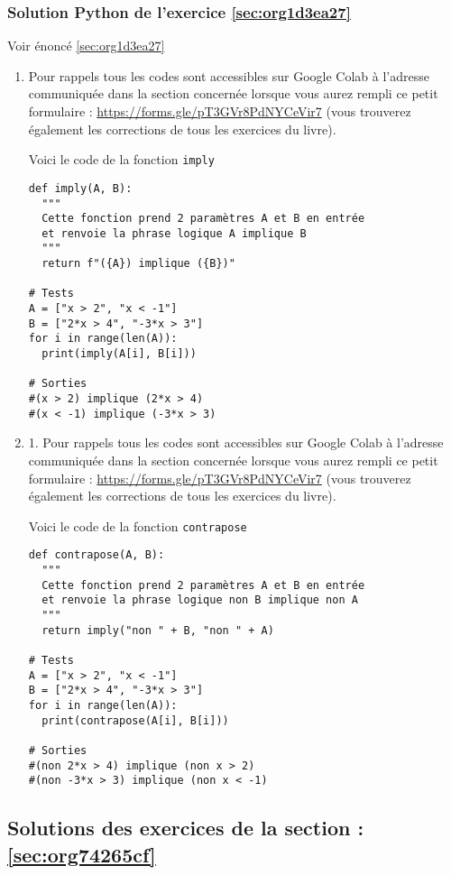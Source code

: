 \documentclass[a4paper, 11pt, twoside]{article}
\begin{document}
\subsubsection{Solution Python de l'exercice \ref{sec:org1d3ea27}}
\label{sec:org4b57ac3}
Voir énoncé \ref{sec:org1d3ea27}

\begin{enumerate}
\item Pour rappels tous les codes sont accessibles sur Google Colab à
l'adresse communiquée dans la section concernée lorsque vous
aurez rempli ce petit formulaire :
\url{https://forms.gle/pT3GVr8PdNYCeVir7} (vous trouverez également
les corrections de tous les exercices du livre).

Voici le code de la fonction \texttt{imply}

\begin{verbatim}
def imply(A, B):
  """
  Cette fonction prend 2 paramètres A et B en entrée 
  et renvoie la phrase logique A implique B
  """
  return f"({A}) implique ({B})"

# Tests
A = ["x > 2", "x < -1"]
B = ["2*x > 4", "-3*x > 3"] 
for i in range(len(A)):
  print(imply(A[i], B[i]))

# Sorties
#(x > 2) implique (2*x > 4)
#(x < -1) implique (-3*x > 3)
\end{verbatim}
\item 1. Pour rappels tous les codes sont accessibles sur Google Colab à
l'adresse communiquée dans la section concernée lorsque vous
aurez rempli ce petit formulaire :
\url{https://forms.gle/pT3GVr8PdNYCeVir7} (vous trouverez également
les corrections de tous les exercices du livre).

Voici le code de la fonction \texttt{contrapose}

\begin{verbatim}
def contrapose(A, B):
  """
  Cette fonction prend 2 paramètres A et B en entrée 
  et renvoie la phrase logique non B implique non A
  """
  return imply("non " + B, "non " + A)

# Tests
A = ["x > 2", "x < -1"]
B = ["2*x > 4", "-3*x > 3"] 
for i in range(len(A)):
  print(contrapose(A[i], B[i]))

# Sorties
#(non 2*x > 4) implique (non x > 2)
#(non -3*x > 3) implique (non x < -1)
\end{verbatim}
\end{enumerate}
\stopcontents[level-2]

\subsection{Solutions des exercices de la section : \ref{sec:org74265cf}}
\label{sec:orgf4be9a2}
\end{document}
